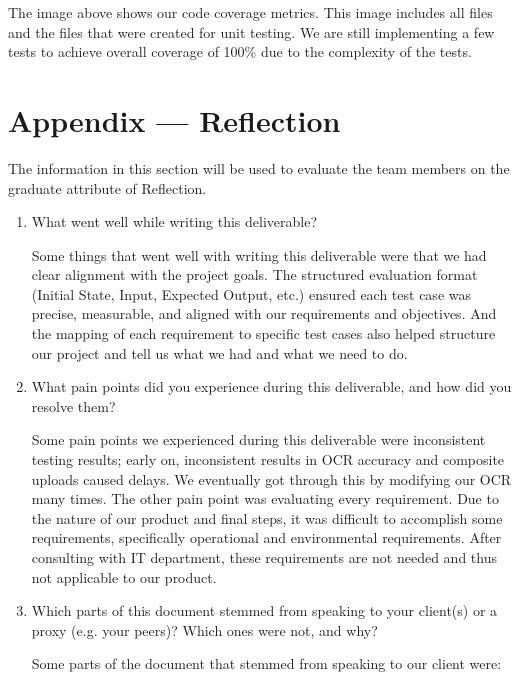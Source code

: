 \documentclass[12pt, titlepage]{article}
\begin{document}
The image above shows our code coverage metrics. This image includes all files and the files that were created for unit testing. We are still implementing a few tests to achieve overall coverage of 100\% due to the complexity of the tests.




\newpage{}
\section*{Appendix --- Reflection}

The information in this section will be used to evaluate the team members on the
graduate attribute of Reflection.



\begin{enumerate}
  \item What went well while writing this deliverable?

 Some things that went well with writing this deliverable were that we had clear alignment with the project goals. The structured evaluation format (Initial State, Input, Expected Output, etc.) ensured each test case was precise, measurable, and aligned with our requirements and objectives. And the mapping of each requirement to specific test cases also helped structure our project and tell us what we had and what we need to do.
  
  \item What pain points did you experience during this deliverable, and how
    did you resolve them?

    Some pain points we experienced during this deliverable were inconsistent testing results; early on, inconsistent results in OCR accuracy and composite uploads caused delays. We eventually got through this by modifying our OCR many times. The other pain point was evaluating every requirement. Due to the nature of our product and final steps, it was difficult to accomplish some requirements, specifically operational and environmental requirements. After consulting with IT department, these requirements are not needed and thus not applicable to our product.

  \item Which parts of this document stemmed from speaking to your client(s) or
  a proxy (e.g. your peers)? Which ones were not, and why?
  
  Some parts of the document that stemmed from speaking to our client were:
  

\end{enumerate}
\end{document}
